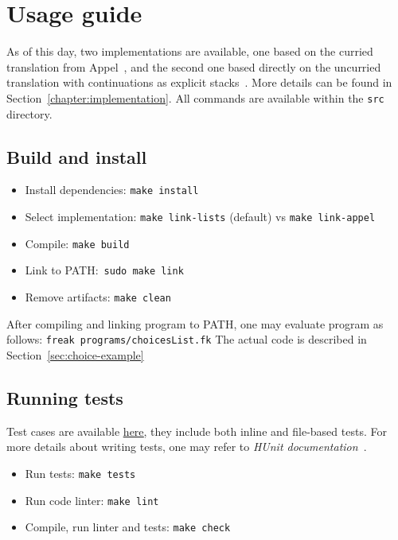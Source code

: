 \documentclass[declaration,shortabstract]{iithesis}
\theoremstyle{definition} \newtheorem{definition}{Definition}[chapter]
\theoremstyle{remark} \newtheorem{remark}[definition]{Observation}
\theoremstyle{plain} \newtheorem{theorem}[definition]{Theorem}
\theoremstyle{plain} \newtheorem{lemma}[definition]{Lemma}
\begin{document}
\section{Usage guide}

    As of this day, two implementations are available, one based on the curried
    translation from Appel~\cite{appel-continuations}, and the second one based
    directly on the uncurried translation with continuations as explicit
    stacks~\cite{handlers-cps-journal}. More details can be found in
    Section~\ref{chapter:implementation}. All commands are available within the
    \verb!src! directory.

    \subsection{Build and install}

    \begin{itemize}
        \item Install dependencies: \verb!make install!
        \item Select implementation: \verb!make link-lists! (default) vs \verb!make link-appel!
        \item Compile: \verb!make build!
        \item Link to PATH:~\verb!sudo make link!
        \item Remove artifacts: \verb!make clean!
    \end{itemize}

    After compiling and linking program to PATH, one may evaluate program as
    follows: \verb!freak programs/choicesList.fk! The actual code is described in Section~\ref{sec:choice-example}

    \subsection{Running tests}

    Test cases are available \href{https://github.com/Tomatosoup97/freak/blob/master/src/Tests.hs}{\underline{here}},
    they include both inline and file-based tests. For more details about
    writing tests, one may refer to \textit{HUnit documentation}~\cite{hunit-docs}.

    \begin{itemize}
        \item Run tests: \verb!make tests!
        \item Run code linter: \verb!make lint!
        \item Compile, run linter and tests: \verb!make check!
    \end{itemize}
\end{document}
